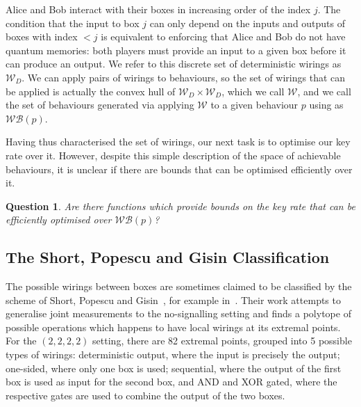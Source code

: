 \documentclass[10pt, a4paper]{article}
\numberwithin{equation}{section} %
\theoremstyle{definition}
\theoremstyle{plain}
\newtheorem{question}{Question}
\newcommand{\?}{\mathrel{?}} %
\newcommand{\sW}{\mathcal{W}}
\newcommand{\sWB}{\mathcal{WB}}
\begin{document}
      Alice and Bob interact with their boxes in increasing order of the index \(j\). The condition that the input to box \(j\) can only depend on the inputs and outputs of boxes with index \(< j\) is equivalent to enforcing that Alice and Bob do not have quantum memories: both players must provide an input to a given box before it can produce an output. We refer to this discrete set of deterministic wirings as \(\sW_D\). We can apply pairs of wirings to behaviours, so the set of wirings that can be applied is actually the convex hull of \(\sW_D \times \sW_D\), which we call \(\sW\), and we call the set of behaviours generated via applying \(\sW\) to a given behaviour \(p\) using  as \(\sWB(p)\).

      Having thus characterised the set of wirings, our next task is to optimise our key rate over it. However, despite this simple description of the space of achievable behaviours, it is unclear if there are bounds that can be optimised efficiently over it.
      \begin{question}\label{qn:wirbehavkeyrate}
        Are there functions which provide bounds on the key rate that can be efficiently optimised over \(\sWB(p)\)?
      \end{question}


      \subsection{The Short, Popescu and Gisin Classification}\label{sec:locwir_class}

      The possible wirings between boxes are sometimes claimed to be classified by the scheme of Short, Popescu and Gisin~\cite{ShortEntangleSwap}, for example in~\cite{ShortClassClaim}. Their work attempts to generalise joint measurements to the no-signalling setting and finds a polytope of possible operations which happens to have local wirings at its extremal points. For the  \((2,2,2,2)\) setting, there are 82 extremal points, grouped into 5 possible types of wirings: deterministic output, where the input is precisely the output; one-sided, where only one box is used; sequential, where the output of the first box is used as input for the second box, and AND and XOR gated, where the respective gates are used to combine the output of the two boxes.
\end{document}
